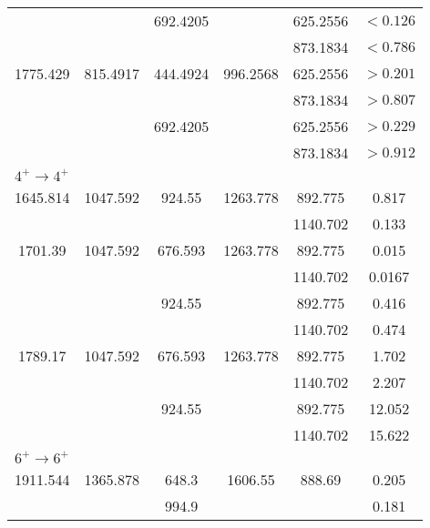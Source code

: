 \begin{portrait}
\begin{longtable}{c|c|c|c|c|c}
         &  & 692.4205 &  & 625.2556 & $<0.126$  \\
         &  &  &  & 873.1834 & $<0.786$  \\ \hline
        1775.429 & 815.4917 & 444.4924 & 996.2568 & 625.2556 & $>0.201$  \\
         &  &  &  & 873.1834 & $>0.807$  \\
         &  & 692.4205 &  & 625.2556 & $>0.229$  \\
         &  &  &  & 873.1834 & $>0.912$  \\ \hline
        \multicolumn{6}{l}{$4^+\rightarrow 4^+$} 	\\ \hline
        1645.814 & 1047.592 & 924.55 & 1263.778 & 892.775 &  0.817  \\ 
         &  &  &  & 1140.702 & 0.133  \\ \hline
        1701.39 & 1047.592 & 676.593 & 1263.778 & 892.775 & 0.015   \\
         &  &  &  & 1140.702 & 0.0167  \\
         &  & 924.55 &  & 892.775 & 0.416   \\
         &  &  &  & 1140.702 & 0.474  \\ \hline
        1789.17 & 1047.592 & 676.593 & 1263.778 & 892.775 & 1.702   \\
         &  &  &  & 1140.702 & 2.207  \\
         &  & 924.55 &  & 892.775 & 12.052   \\
         &  &  &  & 1140.702 & 15.622  \\ \hline
        \multicolumn{6}{l}{$6^+\rightarrow 6^+$} 	\\ \hline
        1911.544 & 1365.878 & 648.3 & 1606.55 & 888.69 & 0.205 \\
        &  &  994.9  &  &  &  0.181   \\
        \bottomrule
    \end{longtable}
\end{portrait}